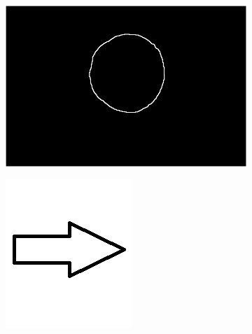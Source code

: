 \documentclass{article}
\begin{document}
\begin{figure}[H]
\begin{subfigure}{.35\textwidth}
  \centering
  \includegraphics[width=0.97\linewidth]{_Figures/raw_data_4_sobel_algo.png}
  \caption{}
  \label{fig:raw_4}
\end{subfigure}%
\begin{subfigure}{.09\textwidth}
  \centering
  \includegraphics[width=0.97\linewidth]{_Figures/leftrightarrow.jpg}

\end{subfigure}
\end{figure}
\end{document}
